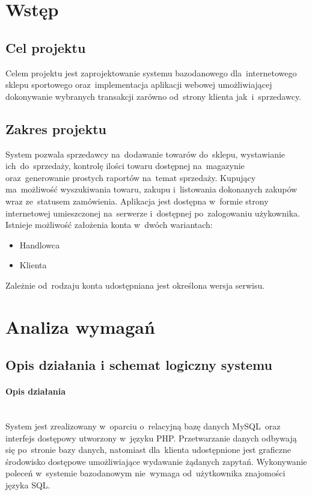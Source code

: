 \documentclass[a4paper, 12pt]{article}
\begin{document}
\listoftables
{}
\cleardoublepage

\section{Wstęp}
\subsection{Cel projektu}
Celem projektu jest zaprojektowanie systemu bazodanowego dla~internetowego sklepu sportowego oraz~implementacja aplikacji webowej umożliwiającej dokonywanie wybranych transakcji zarówno od~strony klienta jak~i~sprzedawcy.
\subsection{Zakres projektu}
System pozwala sprzedawcy na~dodawanie towarów do~sklepu, wystawianie ich~do~sprzedaży, kontrolę ilości towaru dostępnej na~magazynie oraz~generowanie prostych raportów na~temat sprzedaży. Kupujący ma~możliwość wyszukiwania towaru, zakupu i~listowania dokonanych zakupów wraz ze~statusem zamówienia. Aplikacja jest dostępna w~formie strony internetowej umieszczonej na~serwerze i~dostępnej po~zalogowaniu użykownika. Istnieje możliwość założenia konta w~dwóch wariantach:
\begin{itemize}
	\item Handlowca
	\item Klienta
\end{itemize}
Zależnie od~rodzaju konta udostępniana jest określona wersja serwisu.
\section{Analiza wymagań}
\subsection{Opis działania i schemat logiczny systemu}
\paragraph{Opis działania} \mbox{}\\
System jest zrealizowany w~oparciu o~relacyjną bazę danych MySQL~oraz interfejs dostępowy utworzony w~języku PHP. Przetwarzanie danych odbywają się po~stronie bazy danych, natomiast dla~klienta udostępnione jest graficzne środowisko dostępowe umożliwiające wydawanie żądanych zapytań. Wykonywanie poleceń w~systemie bazodanowym nie~wymaga od~użytkownika znajomości języka SQL.
\end{document}
